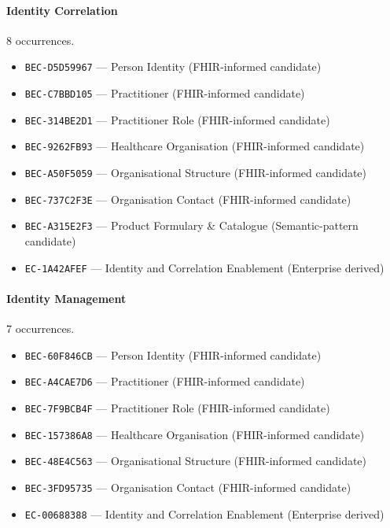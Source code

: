 \documentclass[11pt,a4paper,openany]{book}
\begin{document}
\paragraph{Identity Correlation} 8 occurrences.\par
\begin{itemize}
\item \texttt{BEC-D5D59967} --- Person Identity (FHIR-informed candidate)
\item \texttt{BEC-C7BBD105} --- Practitioner (FHIR-informed candidate)
\item \texttt{BEC-314BE2D1} --- Practitioner Role (FHIR-informed candidate)
\item \texttt{BEC-9262FB93} --- Healthcare Organisation (FHIR-informed candidate)
\item \texttt{BEC-A50F5059} --- Organisational Structure (FHIR-informed candidate)
\item \texttt{BEC-737C2F3E} --- Organisation Contact (FHIR-informed candidate)
\item \texttt{BEC-A315E2F3} --- Product Formulary \& Catalogue (Semantic-pattern candidate)
\item \texttt{EC-1A42AFEF} --- Identity and Correlation Enablement (Enterprise derived)
\end{itemize}
\paragraph{Identity Management} 7 occurrences.\par
\begin{itemize}
\item \texttt{BEC-60F846CB} --- Person Identity (FHIR-informed candidate)
\item \texttt{BEC-A4CAE7D6} --- Practitioner (FHIR-informed candidate)
\item \texttt{BEC-7F9BCB4F} --- Practitioner Role (FHIR-informed candidate)
\item \texttt{BEC-157386A8} --- Healthcare Organisation (FHIR-informed candidate)
\item \texttt{BEC-48E4C563} --- Organisational Structure (FHIR-informed candidate)
\item \texttt{BEC-3FD95735} --- Organisation Contact (FHIR-informed candidate)
\item \texttt{EC-00688388} --- Identity and Correlation Enablement (Enterprise derived)
\end{itemize}
\end{document}
